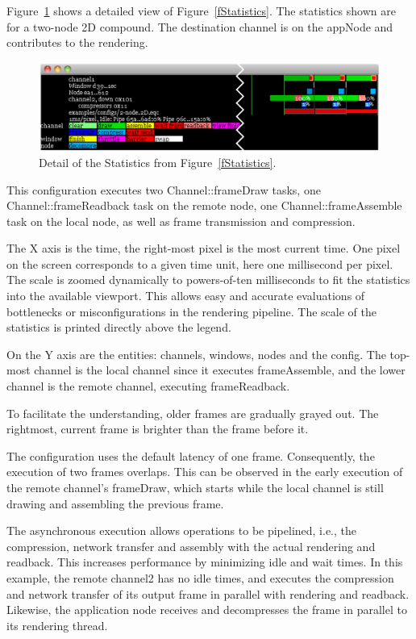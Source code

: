 \documentclass[10pt,a4]{scrartcl}
\newcommand{\fig}[1]{Figure~\ref{#1}}
\begin{document}
\fig{fStatisticsDetail} shows a detailed view of \fig{fStatistics}. The
statistics shown are for a two-node 2D compound. The destination channel
is on the \textsf{appNode} and contributes to the rendering.

\begin{figure}[h!t]
  \includegraphics[width=\textwidth]{images/statisticsDetail}
  {\caption{\label{fStatisticsDetail}Detail of the Statistics from
      \fig{fStatistics}.}}
\end{figure}

This configuration executes two \textsf{Channel::frameDraw} tasks, one
\textsf{Channel::frame\-Read\-back} task on the remote node, one
\textsf{Channel::frameAssemble} task on the local node, as well as frame
transmission and compression.

The X axis is the time, the right-most pixel is the most current time. One
pixel on the screen corresponds to a given time unit, here one millisecond per
pixel. The scale is zoomed dynamically to powers-of-ten milliseconds to fit the
statistics into the available viewport. This allows easy and accurate
evaluations of bottlenecks or misconfigurations in the rendering pipeline. The
scale of the statistics is printed directly above the legend.

On the Y axis are the entities: channels, windows, nodes and the config. The
top-most channel is the local channel since it executes \textsf{frameAssemble},
and the lower channel is the remote channel, executing \textsf{frameReadback}.

To facilitate the understanding, older frames are gradually grayed out. The
rightmost, current frame is brighter than the frame before it.

The configuration uses the default latency of one frame. Consequently, the
execution of two frames overlaps. This can be observed in the early execution of
the remote channel's \textsf{frameDraw}, which starts while the local channel is
still drawing and assembling the previous frame. 

The asynchronous execution allows operations to be pipelined, i.e., the
compression, network transfer and assembly with the actual rendering and
readback. This increases performance by minimizing idle and wait times. In this
example, the remote \textsf{channel2} has no idle times, and executes the
compression and network transfer of its output frame in parallel with rendering
and readback. Likewise, the application node receives and decompresses the frame
in parallel to its rendering thread.
\end{document}
